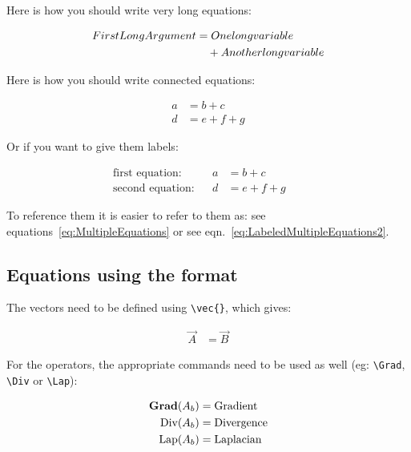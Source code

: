 Here is how you should write very long equations:

\begin{align}
First Long Argument &=	 One long variable
\notag \\
					&\quad + Another long variable
\label{eqn:LongEquation}
\end{align}

Here is how you should write connected equations:

\begin{subequations}
\label{eq:MultipleEquations}
\begin{align}
a &= b+c
\\
d &= e+f+g
\end{align}
\end{subequations}

Or if you want to give them labels:

\begin{subequations}
\label{eq:LabeledMultipleEquations}
\begin{align}
\text{first equation:}&&
a &= b+c
&&
\\
\text{second equation:}&&
d &= e+f+g
&&
\label{eq:LabeledMultipleEquations2}
\end{align}
\end{subequations}

To reference them it is easier to refer to them as: see
equations~\ref{eq:MultipleEquations} or see
eqn.~\eqref{eq:LabeledMultipleEquations2}.

\subsection{Equations using the \texorpdfstring{\telemacsystem{}}{Telemac}
format}

The vectors need to be defined using \verb+\vec{}+, which gives:

\begin{align}
\vec{A} &= \vec{B}
\end{align}

For the operators, the appropriate commands need to be used as well (eg:
\verb+\Grad+, \verb+\Div+ or \verb+\Lap+):

\begin{align}
\text{\bfseries{Grad}}(A_b) &= \text{Gradient}
\\
\text{Div}(A_b) &= \text{Divergence}
\\
\text{Lap}(A_b) &= \text{Laplacian}
\end{align}


